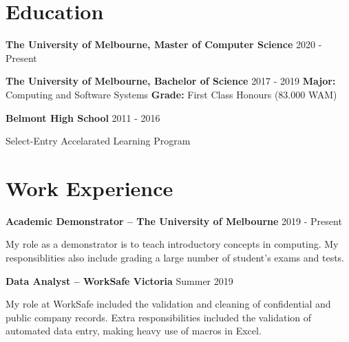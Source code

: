 \documentclass[10pt]{article}
\begin{document}
\begin{minipage}[t]{.60\textwidth}
\vspace*{0pt}

\section{Education}

\textbf{The University of Melbourne, Master of Computer Science} \newline
{\footnotesize 2020 - Present} \newline

\medskip

\textbf{The University of Melbourne, Bachelor of Science} \newline
{\footnotesize 2017 - 2019} \newline
\textbf{Major:} Computing and Software Systems \newline
\textbf{Grade:} First Class Honours (83.000 WAM) \newline

\medskip

\textbf{Belmont High School} \newline
{\footnotesize 2011 - 2016}
\begin{flushleft}
Select-Entry Accelarated Learning Program 
\end{flushleft}

\bigskip

\section{Work Experience}

\textbf{Academic Demonstrator -- The University of Melbourne} \newline
{\footnotesize 2019 - Present}
\begin{flushleft}
My role as a demonstrator is to teach introductory concepts in computing.
My responsiblities also include grading a large number of student's exams and tests. \newline
\end{flushleft}

\medskip

\textbf{Data Analyst -- WorkSafe Victoria} \newline
{\footnotesize Summer 2019}
\begin{flushleft}
My role at WorkSafe included the validation and cleaning of confidential and public company records. 
Extra responsibilities included the validation of automated data entry, making heavy use of macros in Excel. \newline
\end{flushleft} 


\end{minipage}
\end{document}
